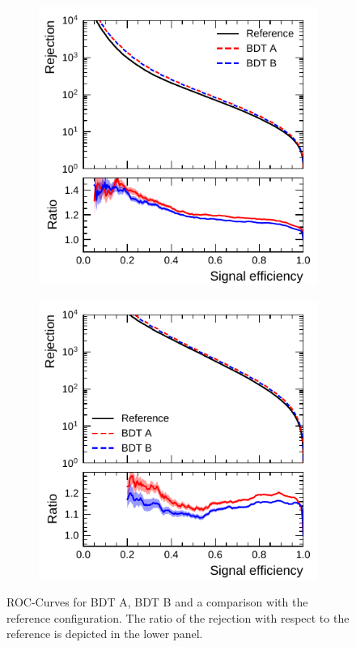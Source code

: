 \begin{figure}[htb]
  \begin{subfigure}[t]{0.48\textwidth}
    \centering
    \includegraphics{./figures/bdt_perf/roc/bootstrap_roc_comparison_1p_fixed.pdf}
    \label{fig:bdt_1p_roc}
  \end{subfigure}\hfill
  \begin{subfigure}[t]{0.48\textwidth}
    \centering
    \includegraphics{./figures/bdt_perf/roc/bootstrap_roc_comparison_3p_fixed.pdf}
    \label{fig:bdt_3p_roc}
  \end{subfigure}
  \caption[ROC-Curve of the optimised BDT]{ROC-Curves for BDT A, BDT B and a
    comparison with the reference configuration. The ratio of the rejection with
    respect to the reference is depicted in the lower panel.}
  \label{fig:bdt_rocs}
\end{figure}

